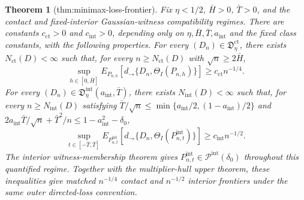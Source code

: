 \documentclass{article}
\newtheorem{theorem}{Theorem}
\begin{document}
\begin{theorem}[thm:minimax-loss-frontier]\label{thm:minimax-loss-frontier}
Fix \(\eta<1/2\), \(\bar H>0\), \(\bar T>0\), and the contact and fixed-interior Gaussian-witness compatibility regimes. There are constants \(c_{\mathrm{ct}}>0\) and \(c_{\mathrm{int}}>0\), depending only on \(\eta,\bar H,\bar T,a_{\mathrm{int}}\) and the fixed class constants, with the following properties. For every \((D_n)\in\mathfrak D_{\eta}^{\mathrm{ct}}\), there exists \(N_{\mathrm{ct}}(D)<\infty\) such that, for every \(n\geq N_{\mathrm{ct}}(D)\) with \(\sqrt n\geq2\bar H\),
\[
 \sup_{h\in[0,\bar H]}E_{P_{n,h}}\!\left[d_{\to}\{D_n,\Theta_I(P_{n,h})\}\right]
 \geq c_{\mathrm{ct}}n^{-1/4}. \tag{1}
\]
For every \((D_n)\in\mathfrak D_{\eta}^{\mathrm{int}}(a_{\mathrm{int}},\bar T)\), there exists \(N_{\mathrm{int}}(D)<\infty\) such that, for every \(n\geq N_{\mathrm{int}}(D)\) satisfying \(\bar T/\sqrt n\leq\min\{a_{\mathrm{int}}/2,(1-a_{\mathrm{int}})/2\}\) and \(2a_{\mathrm{int}}\bar T/\sqrt n+\bar T^2/n\leq1-a_{\mathrm{int}}^2-\delta_0\),
\[
 \sup_{t\in[-\bar T,\bar T]}E_{P_{n,t}^{\mathrm{int}}}\!\left[d_{\to}\{D_n,\Theta_I(P_{n,t}^{\mathrm{int}})\}\right]
 \geq c_{\mathrm{int}}n^{-1/2}. \tag{2}
\]
The interior witness-membership theorem gives \(P_{n,t}^{\mathrm{int}}\in\mathcal P^{\mathrm{int}}(\delta_0)\) throughout this quantified regime. Together with the multiplier-hull upper theorem, these inequalities give matched \(n^{-1/4}\) contact and \(n^{-1/2}\) interior frontiers under the same outer directed-loss convention.
\end{theorem}
\end{document}
